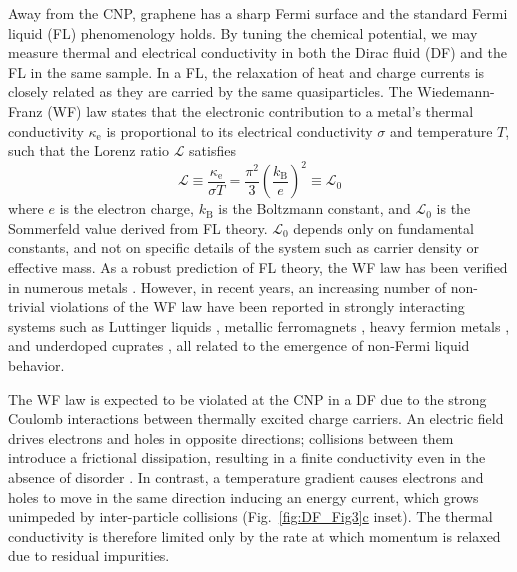 Away from the CNP, graphene has a sharp Fermi surface and the standard Fermi liquid (FL) phenomenology holds. By tuning the chemical potential, we may measure thermal and electrical conductivity in both the Dirac fluid (DF) and the FL in the same sample. In a FL, the relaxation of heat and charge currents is closely related as they are carried by the same quasiparticles. The Wiedemann-Franz (WF) law \cite{ashcroft_solid_1976} states that the electronic contribution to a metal's thermal conductivity $\kappa_{\mathrm{e}}$ is proportional to its electrical conductivity $\sigma$ and temperature $T$, such that the Lorenz ratio $\mathcal{L}$ satisfies
\begin{equation}
\label{eq:DF_WF}
\mathcal{L}\equiv\frac{\kappa_{\mathrm{e}}}{\sigma T}=\frac{\pi^2}{3}\left(\frac{k_{\mathrm{B}}}{e}\right)^2\equiv\mathcal{L}_0
\end{equation}
where $e$ is the electron charge, $k_{\mathrm{B}}$ is the Boltzmann constant, and $\mathcal{L}_0$ is the Sommerfeld value derived from FL theory. $\mathcal{L}_0$ depends only on fundamental constants, and not on specific details of the system such as carrier density or effective mass. As a robust prediction of FL theory, the WF law has been verified in numerous metals \cite{ashcroft_solid_1976}. However, in recent years, an increasing number of non-trivial violations of the WF law have been reported in strongly interacting systems such as Luttinger liquids \cite{wakeham_gross_2011}, metallic ferromagnets \cite{smith_marginal_2008}, heavy fermion metals \cite{pfau_thermal_2012}, and underdoped cuprates \cite{hill_breakdown_2001}, all related to the emergence of non-Fermi liquid behavior.

The WF law is expected to be violated at the CNP in a DF due to the strong Coulomb interactions between thermally excited charge carriers. An electric field drives electrons and holes in opposite directions; collisions between them introduce a frictional dissipation, resulting in a finite conductivity even in the absence of disorder \cite{fritz_quantum_2008}. In contrast, a temperature gradient causes electrons and holes to move in the same direction inducing an energy current, which grows unimpeded by inter-particle collisions (Fig.~\hyperref[fig:DF_Fig3]{\ref*{fig:DF_Fig3}c} inset). The thermal conductivity is therefore limited only by the rate at which momentum is relaxed due to residual impurities.

